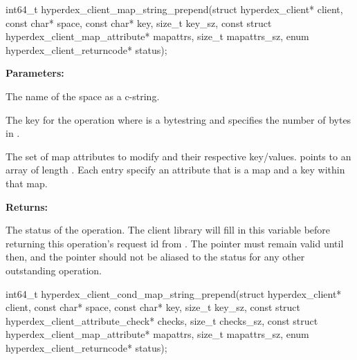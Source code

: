 \funcsep
{}
\begin{ccode}
int64_t hyperdex_client_map_string_prepend(struct hyperdex_client* client,
                const char* space,
                const char* key, size_t key_sz,
                const struct hyperdex_client_map_attribute* mapattrs, size_t mapattrs_sz,
                enum hyperdex_client_returncode* status);
\end{ccode}
\funcdesc 

\noindent\textbf{Parameters:}
\begin{description}[labelindent=\widthof{{\code{mapattrs}, \code{mapattrs\_sz}}},leftmargin=*,noitemsep,nolistsep,align=right]
\item[\code{space}] The name of the space as a c-string.
\item[\code{key}, \code{key\_sz}] The key for the operation where  is a bytestring and  specifies the number of bytes in .
\item[\code{mapattrs}, \code{mapattrs\_sz}] The set of map attributes to modify and their respective key/values.   points to an array of length .  Each entry specify an attribute that is a map and a key within that map.
\end{description}

\noindent\textbf{Returns:}
\begin{description}[labelindent=\widthof{{\code{status}}},leftmargin=*,noitemsep,nolistsep,align=right]
\item[\code{status}] The status of the operation.  The client library will fill in this variable before returning this operation's request id from .  The pointer must remain valid until then, and the pointer should not be aliased to the status for any other outstanding operation.
\end{description}

\funcsep
{}
\begin{ccode}
int64_t hyperdex_client_cond_map_string_prepend(struct hyperdex_client* client,
                const char* space,
                const char* key, size_t key_sz,
                const struct hyperdex_client_attribute_check* checks, size_t checks_sz,
                const struct hyperdex_client_map_attribute* mapattrs, size_t mapattrs_sz,
                enum hyperdex_client_returncode* status);
\end{ccode}
\funcdesc 

